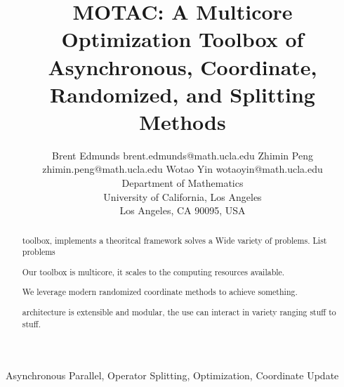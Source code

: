 \documentclass[twoside,11pt]{article}
\newcommand{\pkg}{MOTAC}
\begin{document}
\title{\pkg: A Multicore Optimization Toolbox of Asynchronous, Coordinate, Randomized, and Splitting Methods}

\author{\name Brent Edmunds \email brent.edmunds@math.ucla.edu
       \AND
       \name Zhimin Peng \email zhimin.peng@math.ucla.edu
       \AND
        \name Wotao Yin \email wotaoyin@math.ucla.edu \\
       \addr Department of Mathematics\\
       University of California, Los Angeles\\
       Los Angeles, CA 90095, USA}      

\maketitle

\begin{abstract}
toolbox, implements a theoritcal framework solves a  Wide variety of problems.
        List problems

Our toolbox is multicore, it scales to the computing resources available.

We leverage modern randomized coordinate methods to achieve something.

architecture is extensible and modular, the use can interact in variety ranging stuff to stuff.
\end{abstract}

\begin{keywords}
Asynchronous Parallel, Operator Splitting, Optimization, Coordinate Update
\end{keywords}






 

% 

%

%

%


% 


% 

% 

% 




\end{document}
